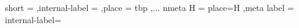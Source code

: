 %
%

\newlength\myheight
\newlength\mydepth
\settototalheight{}
\settodepth{}
\setlength\fboxsep{0pt}
\newcommand*\inlinegraphics[1]{%
  \settototalheight\myheight{Xygp}%
  \settodepth\mydepth{Xygp}%
  \raisebox{-\mydepth}{\texttt{[image: \#1]}}%
}



\usepackage{expkv-cs}
\makeatletter
\newcommand\fig[2][]{\fig@kv{short={#2},#1}{#2}}
\ekvcSplitAndForward\fig@kv\fig@out
{
  short = {}%
  ,internal-label = {} %
  ,place = tbp
  ,...
}
\ekvcSecondaryKeys\fig@kv
{
  nmeta H = place=H %
  ,meta label = internal-label=\label{#1} %
}
\newcommand\fig@out[6]
{%
  \begin{figure}[#3]
    \centering
    \texttt{[image: \#6]}%
    \caption[{#1}]{#5#2}%
  \end{figure}%
}
\makeatother
